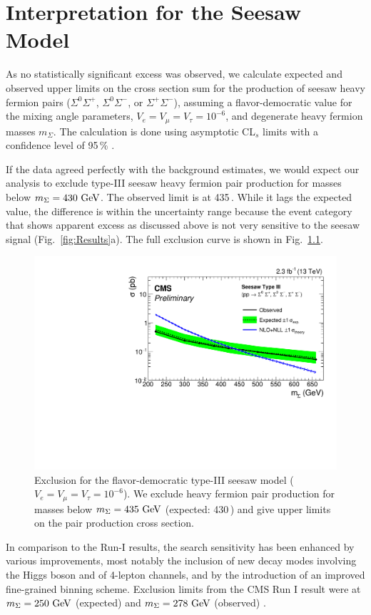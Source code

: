 \chapter{Interpretation for the Seesaw Model}
\label{sec:Interpretation}
\label{sec:Interpretation/Seesaw}

As no statistically significant excess was observed, we calculate expected and observed upper limits on the cross section sum for the production of seesaw heavy fermion pairs ($\Sigma^0\Sigma^+$, $\Sigma^0\Sigma^-$, or $\Sigma^+\Sigma^-$), assuming a flavor-democratic value for the mixing angle parameters, $V_e = V_\mu = V_\tau = 10^{-6}$, and degenerate heavy fermion masses $m_\Sigma$. The calculation is done using asymptotic CL$_s$ limits with a confidence level of 95\,\% \cite{Junk:1999kv,Read:2000ru,Read:2002hq}.

If the data agreed perfectly with the background estimates, we would expect our analysis to exclude type-III seesaw heavy fermion pair production for masses below $m_\Sigma = 430\,\,\text{Ge\hspace{-.08em}V}$. The observed limit is at 435\,\GeV. While it lags the expected value, the difference is within the uncertainty range because the event category that shows apparent excess as discussed above is not very sensitive to the seesaw signal (Fig.~\ref{fig:Results}a). The full exclusion curve is shown in Fig.~\ref{fig:exclusion}.

\begin{figure}[t]
\begin{center}
	\includegraphics[width=.8\textwidth]{Interpretation/exclusion}
	\caption{Exclusion for the flavor-democratic type-III seesaw model ($V_e = V_\mu = V_\tau = 10^{-6}$). We exclude heavy fermion pair production for masses below $m_\Sigma = 435\,\,\text{Ge\hspace{-.08em}V}$ (expected: 430\,\GeV) and give upper limits on the pair production cross section.
	\label{fig:exclusion}}
\end{center}
\end{figure}

In comparison to the Run-I results, the search sensitivity has been enhanced by various improvements, most notably the inclusion of new decay modes involving the Higgs boson and of 4-lepton channels, and by the introduction of an improved fine-grained binning scheme. Exclusion limits from the CMS Run I result were at $m_\Sigma = 250\,\,\text{Ge\hspace{-.08em}V}$ (expected) and $m_\Sigma = 278\,\,\text{Ge\hspace{-.08em}V}$ (observed) \cite{CMS-PAS-EXO-14-001}.
